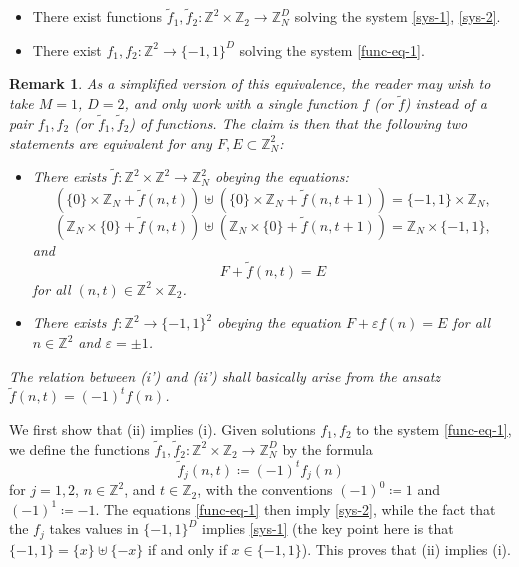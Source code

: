 \documentclass[reqno,a4paper,12pt]{amsart}
\numberwithin{equation}{section}
\numberwithin{figure}{section}
\def\Z{\mathbb{Z}}
\def\eps{\varepsilon}
\theoremstyle{plain}
\newtheorem{remark}[thm]{Remark}
\theoremstyle{definition}
\begin{document}
\begin{itemize}
\item[(i)]  There exist functions $\tilde f_1, \tilde f_2 \colon \Z^2 \times \Z_2 \to \Z_N^D$ solving the system \eqref{sys-1}, \eqref{sys-2}.
\item[(ii)] There exist $f_1,f_2 \colon \Z^2 \to \{-1,1\}^D$ solving the system \eqref{func-eq-1}.
 \end{itemize}
 
 \begin{remark} As a simplified version of this equivalence, the reader may wish to take $M=1$, $D=2$, and only work with a single function $f$ (or $\tilde f$) instead of a pair $f_1,f_2$ (or $\tilde f_1,\tilde f_2$) of functions.  The claim is then that the following two statements are equivalent for any $F,E \subset \Z_N^2$:
 \begin{itemize}
     \item [(i')]  There exists $\tilde f \colon \Z^2 \times \Z^2 \to \Z_N^2$ obeying the equations:
         \[(\{0\} \times \Z_N + \tilde f(n,t)) \uplus (\{0\} \times \Z_N + \tilde f(n,t+1)) = \{-1,1\} \times \Z_N,\]
         \[(\Z_N \times \{0\} + \tilde f(n,t)) \uplus (\Z_N \times \{0\} + \tilde f(n,t+1)) = \Z_N \times \{-1,1\},\] and \[F + \tilde f(n,t) = E \] for all $(n,t) \in \Z^2 \times \Z_2$.
     \item[(ii')]  There exists $f \colon \Z^2 \to \{-1,1\}^2$ obeying the equation $F + \eps f(n) = E$ for all $n \in \Z^2$ and $\eps = \pm 1$.
 \end{itemize}
 The relation between (i') and (ii') shall basically arise from the ansatz $\tilde f(n,t) = (-1)^t f(n)$.
 \end{remark}
 
We first show that (ii) implies (i).
Given solutions $f_1,f_2$ to the system \eqref{func-eq-1}, we define the functions $\tilde f_1, \tilde f_2 \colon \Z^2 \times \Z_2 \to \Z_N^D$ by the formula
$$ \tilde f_j(n,t) \coloneqq (-1)^t f_j(n)$$
for $j=1,2$, $n \in \Z^2$, and $t \in \Z_2$, with the conventions $(-1)^0 \coloneqq 1$ and $(-1)^1 \coloneqq -1$.  The equations \eqref{func-eq-1} then imply \eqref{sys-2}, while the fact that the $f_j$ takes values in $\{-1,1\}^D$ implies \eqref{sys-1} (the key point here is that $\{-1,1\} = \{x\} \uplus \{-x\}$ if and only if $x \in \{-1,1\}$).  This proves that (ii) implies (i).
\end{document}
